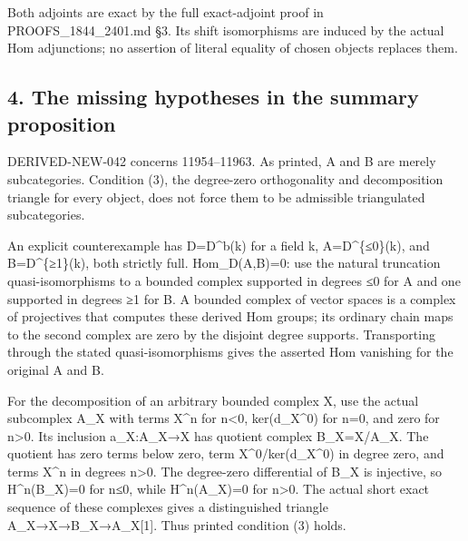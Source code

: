 \documentclass[11pt]{article}
\begin{document}
Both adjoints are exact by the full exact-adjoint proof in PROOFS\_\allowbreak{}1844\_\allowbreak{}2401.md §3. Its shift isomorphisms are induced by the actual Hom adjunctions; no assertion of literal equality of chosen objects replaces them.

\subsection{4. The missing hypotheses in the summary proposition}\label{proofs-11665-12003-the-missing-hypotheses-in-the-summary-proposition}

DERIVED-NEW-042 concerns 11954–\allowbreak{}11963. As printed,\allowbreak{} A and B are merely subcategories. Condition (3)\allowbreak{},\allowbreak{} the degree-zero orthogonality and decomposition triangle for every object,\allowbreak{} does not force them to be admissible triangulated subcategories.

An explicit counterexample has D\allowbreak{}=D\textasciicircum{}b(k)\allowbreak{} for a field k,\allowbreak{} A\allowbreak{}=D\textasciicircum{}\{≤0\}(k)\allowbreak{},\allowbreak{} and B\allowbreak{}=D\textasciicircum{}\{≥1\}(k)\allowbreak{},\allowbreak{} both strictly full. Hom\_\allowbreak{}D(A,\allowbreak{}B)\allowbreak{}\allowbreak{}=0:\allowbreak{} use the natural truncation quasi-isomorphisms to a bounded complex supported in degrees ≤0 for A and one supported in degrees ≥1 for B. A bounded complex of vector spaces is a complex of projectives that computes these derived Hom groups; its ordinary chain maps to the second complex are zero by the disjoint degree supports. Transporting through the stated quasi-isomorphisms gives the asserted Hom vanishing for the original A and B.

For the decomposition of an arbitrary bounded complex X,\allowbreak{} use the actual subcomplex A\_\allowbreak{}X with terms X\^{}n for n<0,\allowbreak{} ker(d\_\allowbreak{}X\textasciicircum{}0)\allowbreak{} for n\allowbreak{}=0,\allowbreak{} and zero for n\textgreater0. Its inclusion a\_\allowbreak{}X:\allowbreak{}A\_\allowbreak{}X\allowbreak{}→X has quotient complex B\_\allowbreak{}X\allowbreak{}=X/\allowbreak{}A\_\allowbreak{}X. The quotient has zero terms below zero,\allowbreak{} term X\textasciicircum{}0/\allowbreak{}ker(d\_\allowbreak{}X\textasciicircum{}0)\allowbreak{} in degree zero,\allowbreak{} and terms X\^{}n in degrees n\textgreater0. The degree-zero differential of B\_\allowbreak{}X is injective,\allowbreak{} so H\textasciicircum{}n(B\_\allowbreak{}X)\allowbreak{}\allowbreak{}=0 for n≤0,\allowbreak{} while H\textasciicircum{}n(A\_\allowbreak{}X)\allowbreak{}\allowbreak{}=0 for n\textgreater0. The actual short exact sequence of these complexes gives a distinguished triangle A\_\allowbreak{}X\allowbreak{}→X\allowbreak{}→B\_\allowbreak{}X\allowbreak{}→A\_\allowbreak{}X[1]\allowbreak{}. Thus printed condition (3)\allowbreak{} holds.
\end{document}
